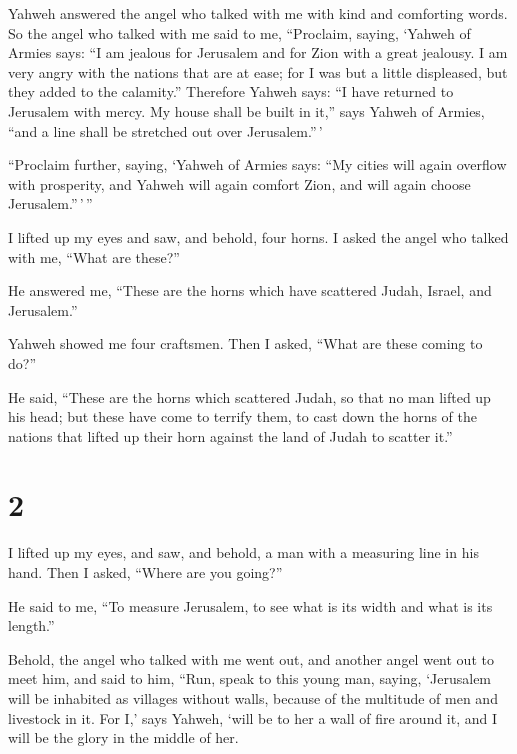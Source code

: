 Yahweh answered the angel who talked with me with kind and
comforting words.  So the angel who talked with me said to
me, ``Proclaim, saying, `Yahweh of Armies says: ``I am jealous for
Jerusalem and for Zion with a great jealousy.  I am very
angry with the nations that are at ease; for I was but a little
displeased, but they added to the calamity.''  Therefore
Yahweh says: ``I have returned to Jerusalem with mercy. My house shall
be built in it,'' says Yahweh of Armies, ``and a line shall be stretched
out over Jerusalem.''\,'

 ``Proclaim further, saying, `Yahweh of Armies says: ``My
cities will again overflow with prosperity, and Yahweh will again
comfort Zion, and will again choose Jerusalem.''\,'\,''

 I lifted up my eyes and saw, and behold, four horns.
 I asked the angel who talked with me, ``What are these?''

He answered me, ``These are the horns which have scattered Judah,
Israel, and Jerusalem.''

 Yahweh showed me four craftsmen.  Then I
asked, ``What are these coming to do?''

He said, ``These are the horns which scattered Judah, so that no man
lifted up his head; but these have come to terrify them, to cast down
the horns of the nations that lifted up their horn against the land of
Judah to scatter it.''

\hypertarget{section-1}{%
\section{2}\label{section-1}}

 I lifted up my eyes, and saw, and behold, a man with a
measuring line in his hand.  Then I asked, ``Where are you
going?''

He said to me, ``To measure Jerusalem, to see what is its width and what
is its length.''

 Behold, the angel who talked with me went out, and another
angel went out to meet him,  and said to him, ``Run, speak
to this young man, saying, `Jerusalem will be inhabited as villages
without walls, because of the multitude of men and livestock in it.
 For I,' says Yahweh, `will be to her a wall of fire around
it, and I will be the glory in the middle of her.

